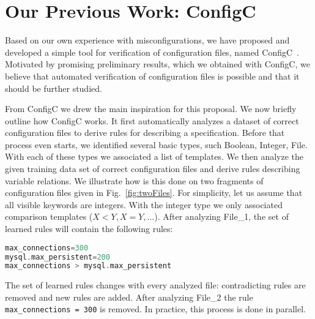 \section{Our Previous Work: ConfigC}
\label{sec:prelim}

Based on our own experience with misconfigurations,
we have proposed and developed a simple tool for verification of 
configuration files, named
ConfigC~\cite{santolucitoCAV}. Motivated by promising preliminary
results, which we obtained with ConfigC, we believe that automated 
verification of configuration files is possible and that it should be further studied.

From ConfigC we drew the main inspiration for this proposal. We now briefly
outline how ConfigC works. It first automatically
analyzes a dataset of correct configuration files to derive
 rules for describing a specification. Before that process even starts,
we identified several basic types, 
such Boolean, Integer, File. With each of these types we associated a 
list of templates. We then analyze the given training data set of 
correct configuration files and derive rules describing variable                                                                                                                                                                                                                                                                                                                                                                                                                       
relations. We illustrate how is this done on two fragments of 
configuration files given in Fig.~\ref{fig:twoFiles}. For simplicity, let us 
assume that all visible
keywords are integers. With the integer type we only associated comparison templates ($X < Y, X = Y, \ldots$). After 
analyzing File\_1, the set of learned rules will contain the following rules:
\begin{lstlisting}[language=C, xleftmargin=.01\textwidth]
max_connections=300
mysql.max_persistent=200
max_connections > mysql.max_persistent
\end{lstlisting}
The set of learned rules changes with every analyzed file: contradicting 
rules are removed and new rules are added. After analyzing File\_2 the rule \texttt{max\_connections = 300} is removed. In practice, this process is done 
in parallel. 


